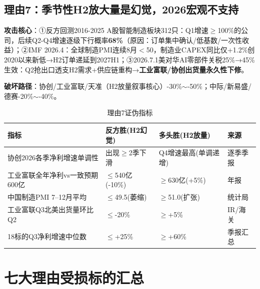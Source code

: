 \subsection{理由7：季节性H2放大量是幻觉，2026宏观不支持}

\textbf{攻击核心}：①反方回测2016-2025 A股智能制造板块312只：Q1增速$\geq$100\%的公司，后续Q2-Q4增速逐级下行概率\textbf{68\%}（原因：订单集中确认/低基数/一次性收益）；②IMF 2026.4：全球制造PMI连续8月$<$50，制造业CAPEX同比仅+1.2\%创2020以来新低→H2订单递延到2027H1；③2026.7.1美对华AI零部件关税25\%→45\%生效：Q2抢出口透支H2需求+供应链重构→\textbf{工业富联/协创出货量永久性下修}。

\textbf{破坏路径}：协创/工业富联/天准（H2放量叙事核心）-30\%$\sim$-50\%；中际/新易盛/德赛-20\%$\sim$-40\%。

\begin{table}[H]
\centering\scriptsize
\renewcommand{\arraystretch}{1.1}
\begin{tabularx}{\textwidth}{l X X l}
\toprule
\textbf{指标} & \textbf{反方胜(H2幻觉)} & \textbf{多头胜(H2放量)} & \textbf{来源} \\
\midrule
协创2026各季净利增速单调性 & 出现$\geq$2季下滑 & Q4增速最高(单调递增) & 逐季季报 \\
工业富联全年净利vs一致预期600亿 & $\leq$540亿(-10\%) & $\geq$630亿(+5\%) & 年报 \\
中国制造PMI 7--12月平均 & $\leq$49.5(萎缩) & $\geq$51.0(扩张) & 统计局 \\
工业富联Q3北美出货量环比Q2 & $\leq$-20\% & $\geq$+5\% & IR/海关 \\
18标的Q3净利增速中位数 & $\leq$+25\% & $\geq$+60\% & 季报汇总 \\
\bottomrule
\end{tabularx}
\caption{理由7证伪指标}
\end{table}

\section{七大理由受损标的汇总}

